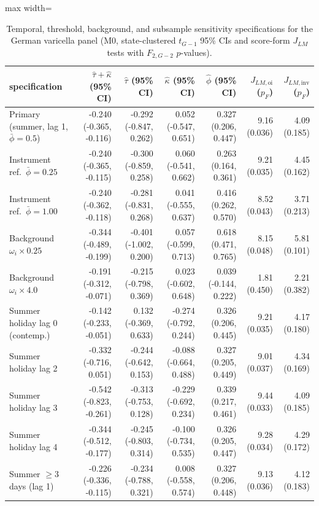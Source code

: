 \begin{table}[!t]
\centering
\caption{Temporal, threshold, background, and subsample sensitivity specifications for the German varicella panel (M0, state-clustered $t_{G-1}$ 95\% CIs and score-form $J_{LM}$ tests with $F_{2,G-2}$ $p$-values).}
\label{tab:app-all}
\footnotesize
\setlength{\tabcolsep}{3.0pt}
\begin{adjustbox}{max width=\linewidth}
\renewcommand{\arraystretch}{0.86}\begin{tabular}{lrrrrrr}
\toprule
specification & $\hat\tau+\hat\kappa$ (95\% CI) & $\hat\tau$ (95\% CI) & $\hat\kappa$ (95\% CI) & $\hat\phi$ (95\% CI) & $J_{LM,\mathrm{oi}}$ ($p_F$) & $J_{LM,\mathrm{inv}}$ ($p_F$) \\
\midrule
Primary (summer, lag 1, $\bar\phi=0.5$) & -0.240 (-0.365, -0.116) & -0.292 (-0.847, 0.262) & 0.052 (-0.547, 0.651) & 0.327 (0.206, 0.447) & 9.16 (0.036) & 4.09 (0.185) \\
Instrument ref.\ $\bar\phi = 0.25$ & -0.240 (-0.365, -0.115) & -0.300 (-0.859, 0.258) & 0.060 (-0.541, 0.662) & 0.263 (0.164, 0.361) & 9.21 (0.035) & 4.45 (0.162) \\
Instrument ref.\ $\bar\phi = 1.00$ & -0.240 (-0.362, -0.118) & -0.281 (-0.831, 0.268) & 0.041 (-0.555, 0.637) & 0.416 (0.262, 0.570) & 8.52 (0.043) & 3.71 (0.213) \\
Background $\omega_i \times 0.25$ & -0.344 (-0.489, -0.199) & -0.401 (-1.002, 0.200) & 0.057 (-0.599, 0.713) & 0.618 (0.471, 0.765) & 8.15 (0.048) & 5.81 (0.101) \\
Background $\omega_i \times 4.0$ & -0.191 (-0.312, -0.071) & -0.215 (-0.798, 0.369) & 0.023 (-0.602, 0.648) & 0.039 (-0.144, 0.222) & 1.81 (0.450) & 2.21 (0.382) \\
Summer holiday lag 0 (contemp.) & -0.142 (-0.233, -0.051) & 0.132 (-0.369, 0.633) & -0.274 (-0.792, 0.244) & 0.326 (0.206, 0.445) & 9.21 (0.035) & 4.17 (0.180) \\
Summer holiday lag 2 & -0.332 (-0.716, 0.051) & -0.244 (-0.642, 0.153) & -0.088 (-0.664, 0.488) & 0.327 (0.205, 0.449) & 9.01 (0.037) & 4.34 (0.169) \\
Summer holiday lag 3 & -0.542 (-0.823, -0.261) & -0.313 (-0.753, 0.128) & -0.229 (-0.692, 0.234) & 0.339 (0.217, 0.461) & 9.44 (0.033) & 4.09 (0.185) \\
Summer holiday lag 4 & -0.344 (-0.512, -0.177) & -0.245 (-0.803, 0.314) & -0.100 (-0.734, 0.535) & 0.326 (0.205, 0.447) & 9.28 (0.034) & 4.29 (0.172) \\
Summer $\ge 3$ days (lag 1) & -0.226 (-0.336, -0.115) & -0.234 (-0.788, 0.321) & 0.008 (-0.558, 0.574) & 0.327 (0.206, 0.448) & 9.13 (0.036) & 4.12 (0.183) \\

\end{tabular}
\end{adjustbox}
\end{table}
